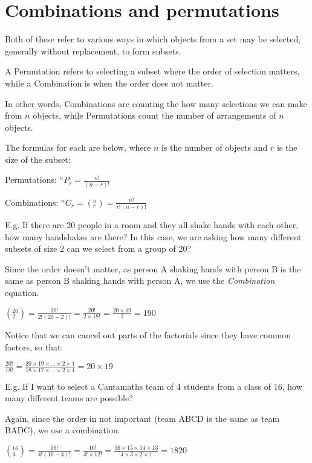\documentclass[../main.tex]{subfiles}
\begin{document}
\section{Combinations and permutations}
Both of these refer to various ways in which objects from a set may be selected, generally without replacement, to form subsets.

A Permutation refers to selecting a subset where the order of selection matters, while a Combination is when the order does not matter.

In other words, Combinations are counting the how many selections we can make from \(n\) objects, while Permutations count the number of arrangements of \(n\) objects.

The formulas for each are below, where \(n\) is the number of objects and \(r\) is the size of the subset:

Permutations: \(^nP_r=\frac{n!}{(n-r)!}\)

Combinations: \(^nC_r=(_r^n)=\frac{n!}{r!(n-r)!}\)

\noindent E.g. If there are 20 people in a room and they all shake hands with each other, how many handshakes are there?
In this case, we are asking how many different subsets of size 2 can we select from a group of 20?

Since the order doesn't matter, as person A shaking hands with person B is the same as person B shaking hands with person A, we use the \textit{Combination} equation.

\((_2^{20})=\frac{20!}{2!(20-2)!}=\frac{20!}{2\times 18!}=\frac{20\times19}{2}=190\)

Notice that we can cancel out parts of the factorials since they have common factors, so that:

\(\frac{20!}{18!}=\frac{20\times 19\times ... \times 2 \times 1}{18 \times 17 \times ... \times 2 \times 1} = 20 \times 19\)

E.g. If I want to select a Cantamaths team of 4 students from a class of 16, how many different teams are possible?

Again, since the order in not important (team ABCD is the same as team BADC), we use a combination.

\((_4^16)=\frac{16!}{4!(16-4)!}=\frac{16!}{4!\times 12!}=\frac{16\times 15\times 14\times 13}{4\times 3\times 2\times 1}=1820\)
\pagebreak
\end{document}
